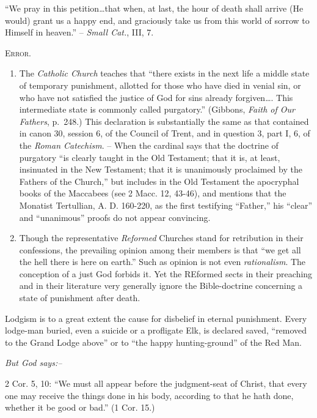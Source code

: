 \documentclass[
]{book}
\begin{document}
``We pray in this petition\ldots that when, at last, the hour of death shall arrive (He would) grant us a happy end, and graciously take us from this world of sorrow to Himself in heaven.'' -- \emph{Small Cat.}, III, 7.

\begin{center}
\textsc{Error.}
\end{center}

\begin{enumerate}
\def\labelenumi{\arabic{enumi}.}
\item
  The \emph{Catholic Church} teaches that ``there exists in the next life a middle state of temporary punishment, allotted for those who have died in venial sin, or who have not satisfied the justice of God for sins already forgiven\ldots. This intermediate state is commonly called purgatory.'' (Gibbons, \emph{Faith of Our Fathers}, p.~248.) This declaration is substantially the same as that contained in canon 30, session 6, of the Council of Trent, and in question 3, part I, 6, of the \emph{Roman Catechism}. -- When the cardinal says that the doctrine of purgatory ``is clearly taught in the Old Testament; that it is, at least, insinuated in the New Testament; that it is unanimously proclaimed by the Fathers of the Church,'' but includes in the Old Testament the apocryphal books of the Maccabees (see 2 Macc. 12, 43-46), and mentions that the Monatist Tertullian, A. D. 160-220, as the first testifying ``Father,'' his ``clear'' and ``unanimous'' proofs do not appear convincing.
\item
  Though the representative \emph{Reformed} Churches stand for retribution in their confessions, the prevailing opinion among their members is that ``we get all the hell there is here on earth.'' Such as opinion is not even \emph{rationalism}. The conception of a just God forbids it. Yet the REformed sects in their preaching and in their literature very generally ignore the Bible-doctrine concerning a state of punishment after death.
\end{enumerate}

Lodgism is to a great extent the cause for disbelief in eternal punishment. Every lodge-man buried, even a suicide or a profligate Elk, is declared saved, ``removed to the Grand Lodge above'' or to ``the happy hunting-ground'' of the Red Man.

\begin{center}
\textsl{But God says:--}
\end{center}

2 Cor. 5, 10: ``We must all appear before the judgment-seat of Christ, that every one may receive the things done in his body, according to that he hath done, whether it be good or bad.'' (1 Cor. 15.)
\end{document}
